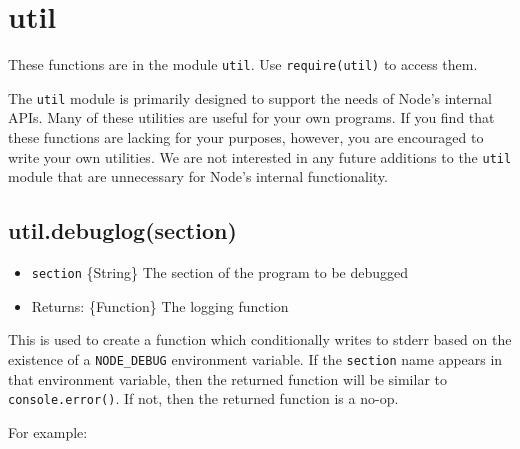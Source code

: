 \section{util}\label{util}

\begin{Shaded}
\begin{Highlighting}[]
 
\end{Highlighting}
\end{Shaded}

These functions are in the module
\texttt{\textquotesingle{}util\textquotesingle{}}. Use
\texttt{require(\textquotesingle{}util\textquotesingle{})} to access
them.

The \texttt{util} module is primarily designed to support the needs of
Node's internal APIs. Many of these utilities are useful for your own
programs. If you find that these functions are lacking for your
purposes, however, you are encouraged to write your own utilities. We
are not interested in any future additions to the \texttt{util} module
that are unnecessary for Node's internal functionality.

\subsection{util.debuglog(section)}\label{util.debuglogsection}

\begin{itemize}
\itemsep1pt\parskip0pt
\item
  \texttt{section} \{String\} The section of the program to be debugged
\item
  Returns: \{Function\} The logging function
\end{itemize}

This is used to create a function which conditionally writes to stderr
based on the existence of a \texttt{NODE\_DEBUG} environment variable.
If the \texttt{section} name appears in that environment variable, then
the returned function will be similar to \texttt{console.error()}. If
not, then the returned function is a no-op.

For example:

\begin{Shaded}
\end{Shaded}

